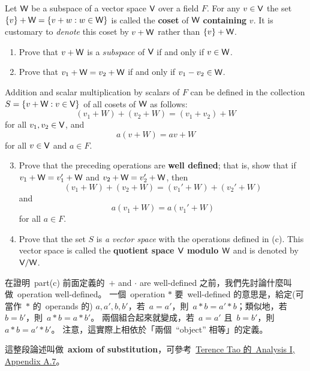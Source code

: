 \begin{exercise} \label{exercise 1.3.31}
Let \(\textsf{W}\) be a subspace of a vector space \(\textsf{V}\) over a field \(F\).
For any \(v \in \textsf{V}\) the set \(\{v\} + \textsf{W} = \{v + w : w \in \textsf{W}\}\) is called the \textbf{coset} of \(\textsf{W}\) \textbf{containing} \(v\).
It is customary to \emph{denote} this coset by \(v + \textsf{W}\) rather than \(\{v\} + \textsf{W}\).
\begin{enumerate}
    \item Prove that \(v + \textsf{W}\) is a \(subspace\) of \(\textsf{V}\) if and only if \(v \in \textsf{W}\).
    \item Prove that \(v_1 + \textsf{W} = v_2 + \textsf{W}\) if and only if \(v_1 - v_2 \in \textsf{W}\).
\end{enumerate}
Addition and scalar multiplication by scalars of \(F\) can be defined in the collection \(S = \{v + \textsf{W}: v \in \textsf{V}\}\) of all cosets of \(\textsf{W}\) as follows:
\[
    (v_1 + W) + (v_2 + W) = (v_1 + v_2) + W
\]
for all \(v_1, v_2 \in \textsf{V}\), and
\[
    a(v + W) = av + W
\]
for all \(v \in \textsf{V}\) and \(a \in F\).
\begin{enumerate}
    \setcounter{enumi}{2}
    \item Prove that the preceding operations are \textbf{well defined};
        that is, show that if \(v_1 + \textsf{W} = v_1' + \textsf{W}\) and \(v_2 + \textsf{W} = v_2' + \textsf{W}\), then
        \[
            (v_1 + W) + (v_2 + W) = (v_1' + W) + (v_2' + W)
        \]
        and
        \[
            a(v_1 + W) = a(v_1' + W)
        \]
        for all \(a \in F\).
    \item Prove that the set \(S\) is \emph{a vector space} with the operations defined in (c).
    This vector space is called the \textbf{quotient space \(\textsf{V}\) modulo \(\textsf{W}\)} and is denoted by \(\textsf{V} / \textsf{W}\).
\end{enumerate}
\end{exercise}

\begin{note}
在證明\ part(c) 前面定義的\ \(+\) and \(\cdot\) are well-defined 之前，我們先討論什麼叫做\ operation well-defined。
一個\ operation \(*\) 要\ well-defined 的意思是，給定(可當作\ \(*\) 的\ operands 的) \(a, a', b, b'\)，若\ \(a = a'\)，則\ \(a * b = a' * b\)；類似地，若\ \(b = b'\)，則\ \(a * b = a * b'\)。
兩個組合起來就變成，若\ \(a = a'\) 且\ \(b = b'\)，則\ \(a * b = a' * b'\)。
注意，這實際上相依於「兩個\ ``object'' 相等」的定義。

這整段論述叫做\ \textbf{axiom of substitution}，可參考\ \href{https://link.springer.com/book/10.1007/978-981-10-1789-6}{Terence Tao 的\ Analysis I, Appendix A.7}。
\end{note}

